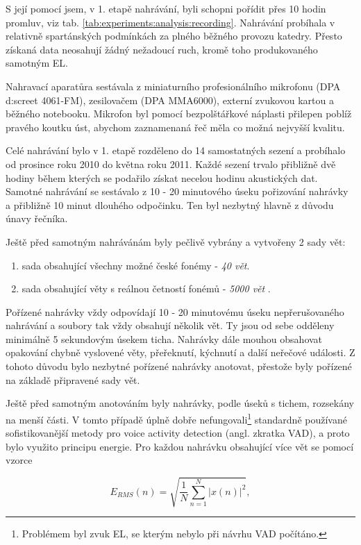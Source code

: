 S její pomocí jsem, v 1. etapě nahrávání, byli schopni pořídit přes 10 hodin promluv, viz tab. \ref{tab:experiments:analysis:recording}. Nahrávání probíhala v relativně spartánských podmínkách za plného běžného provozu katedry. Přesto získaná data neosahují žádný nežadoucí ruch, kromě toho produkovaného samotným EL.

Nahravací aparatůra sestávala z miniaturního profesionálního mikrofonu (DPA d:screet 4061-FM), zesilovačem (DPA MMA6000), externí zvukovou kartou a běžného notebooku. Mikrofon byl pomocí bezpolštářkové náplasti přilepen poblíž pravého koutku úst, abychom zaznamenaná řeč měla co možná nejvyšší kvalitu.

Celé nahrávání bylo v 1. etapě rozděleno do 14 samostatných sezení a probíhalo od prosince roku 2010 do května roku 2011. Každé sezení trvalo přibližně dvě hodiny během kterých se podařilo získat necelou hodinu akustických dat. Samotné nahrávání se sestávalo z 10 - 20 minutového úseku pořizování nahrávky a přibližně 10 minut dlouhého odpočinku. Ten byl nezbytný hlavně z důvodu únavy řečníka.

Ještě před samotným nahrávánám byly pečlivě vybrány a vytvořeny 2 sady vět:

\begin{enumerate}
  \item sada obsahující všechny možné české fonémy - \textit{40 vět}.
  \item sada obsahující věty s reálnou četností fonémů - \textit{5000 vět} \cite{Radova2000}.
\end{enumerate}

\noindent Pořízené nahrávky vždy odpovídají 10 - 20 minutovému úseku nepřerušovaného nahrávání a soubory tak vždy obsahují několik vět. Ty jsou od sebe odděleny minimálně 5 sekundovým úsekem ticha. Nahrávky dále mouhou obsahovat opakování chybně vyslovené věty, přeřeknutí, kýchnutí a další neřečové události. Z tohoto důvodu bylo nezbytné pořízené nahrávky anotovat, přestože byly pořízené na základě připravené sady vět.

Ještě před samotným anotováním byly nahrávky, podle úseků s tichem, rozsekány na menší části. V tomto případě úplně dobře nefungovali\footnote{Problémem byl zvuk EL, se kterým nebylo při návrhu VAD počítáno.} standardně používané sofistikovanější metody pro voice activity detection (angl. zkratka VAD), a proto bylo využito principu energie. Pro každou nahrávku obsahující více vět se pomocí vzorce

\begin{equation}
  \label{eq:experiments:analysis:energy}
  E_{RMS}(n) = \sqrt{\frac{1}{N} \sum_{n=1}^{N} \left| x(n) \right|^2},
\end{equation}


